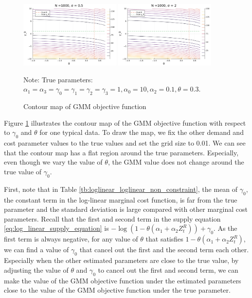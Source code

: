 \documentclass[11pt, a4paper]{article}
\begin{document}
\begin{figure}[!htbp]
  \begin{center}
  \includegraphics[width = 0.45\textwidth]
  {figuretable/contour_loglinear_loglinear_n_1000_sigma_0.5.pdf}
  \includegraphics[width = 0.45\textwidth]
  {figuretable/contour_loglinear_loglinear_n_1000_sigma_2.pdf}
  \caption{Contour map of GMM objective function}
  \label{fg:contour_loglinear_loglinear_n_1000_sigma_2} 
  \end{center}
  \footnotesize
  Note: True parameters: $\alpha_1 = \alpha_3 = \gamma_0 = \gamma_1 = \gamma_2  = \gamma_3 = 1, \alpha_0 = 10, \alpha_2 = 0.1,  \theta = 0.3.$
\end{figure} 

Figure \ref{fg:contour_loglinear_loglinear_n_1000_sigma_2} illustrates the contour map of the GMM objective function with respect to $\gamma_0$ and $\theta$ for one typical data.
To draw the map, we fix the other demand and cost parameter values to the true values and set the grid size to 0.01.
We can see that the contour map has a flat region around the true parameters.
Especially, even though we vary the value of $\theta$, the GMM value does not change around the true value of $\gamma_0$.

First, note that in Table \ref{tb:loglinear_loglinear_non_constraint}, the mean of $\gamma_0$, the constant term in the log-linear marginal cost function, is far from the true parameter and the standard deviation is large compared with other marginal cost parameters. 
Recall that the first and second term in the supply equation \eqref{eq:log_linear_supply_equation} is $-\log(1 - \theta(\alpha_1 + \alpha_2 Z^{R}_{t})) + \gamma_0$.
As the first term is always negative, for any value of $\theta$ that satisfies $1 - \theta(\alpha_1 + \alpha_2 Z^{R}_{t})$, we can find a value of $\gamma_0$ that cancel out the first and the second term each other.
Especially when the other estimated parameters are close to the true value, by adjusting the value of $\theta$ and $\gamma_0$ to cancel out the first and second term, we can make the value of the GMM objective function under the estimated parameters close to the value of the GMM objective function under the true parameter.
\end{document}
